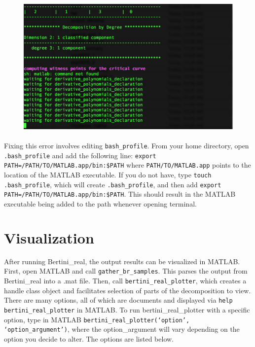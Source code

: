 \documentclass[10pt]{article}
\begin{document}
\begin{figure}[!hb]
\includegraphics[width = 13cm, height = 7cm]{MATLAB_Executable_Failure}
\end{figure}

Fixing this error involves editing \texttt{bash\_profile}. From your home directory, open \texttt{.bash\_profile} and add the following line: \texttt{export PATH=/PATH/TO/MATLAB.app/bin:\$PATH} where \texttt{PATH/TO/MATLAB.app} points to the location of the MATLAB executable. If you do not have, type \texttt{touch .bash\_profile}, which will create \texttt{.bash\_profile}, and then add \texttt{export PATH=/PATH/TO/MATLAB.app/bin:\$PATH}. This should result in the MATLAB executable being added to the path whenever opening terminal. 

\section{Visualization}
After running Bertini\_real, the output results can be visualized in MATLAB. First, open MATLAB and call \texttt{gather\_br\_samples}. This parses the output from Bertini\_real into a .mat file. Then, call \texttt{bertini\_real\_plotter}, which creates a handle class object and facilitates selection of parts of the decomposition to view. There are many options, all of which are documents and displayed via \texttt{help bertini\_real\_plotter} in MATLAB. To run bertini\_real\_plotter with a specific option, type in MATLAB \texttt{bertini\_real\_plotter(`option', `option\_argument')}, where the option\_argument will vary depending on the option you decide to alter. The options are listed below. 
\end{document}
